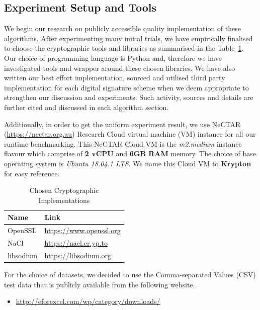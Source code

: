 \documentclass[10pt,sigconf]{acmart}
\begin{document}
\subsection{Experiment Setup and Tools}

We begin our research on publicly accessible quality implementation of these algorithms. After experimenting many initial trials, we have empirically finalised to choose the cryptographic tools and libraries as summarised in the Table~\ref{tab:libTable}. Our choice of programming language is Python and, therefore we have investigated tools and wrapper around these chosen libraries. We have also written our best effort implementation, sourced and utilised third party implementation for each digital signature scheme when we deem appropriate to strengthen our discussion and experiments. Such activity, sources and details are further cited and discussed in each algorithm section.

Additionally, in order to get the uniform experiment result, we use NeCTAR (\url{https://nectar.org.au}) Research Cloud virtual machine (VM) instance for all our runtime benchmarking. This NeCTAR Cloud VM is the \textit{m2.medium} instance flavour which comprise of \textbf{2 vCPU} and \textbf{6GB RAM} memory. The choice of base operating system is \textit{Ubuntu 18.04.1 LTS}. We name this Cloud VM to \textbf{Krypton} for easy reference. 

\begin{table}[H]
\caption{Chosen Cryptographic Implementations}
    \begin{tabular}{ |p{2cm}|p{5.5cm}|  }
    \hline
    \textbf{Name} & \textbf{Link} \\
    \hline
    OpenSSL & \url{https://www.openssl.org} \\
    \hline
    NaCl & \url{https://nacl.cr.yp.to} \\
    \hline
    libsodium & \url{https://libsodium.org} \\
    \hline    
    \end{tabular}
  \label{tab:libTable}
\end{table}

For the choice of datasets, we decided to use the Comma-separated Values (CSV) test data that is publicly available from the following website.
\begin{itemize}
    \item \href{http://eforexcel.com/wp/downloads-18-sample-csv-files-data-sets-for-testing-sales/}{http://eforexcel.com/wp/category/downloads/}
\end{itemize}
\end{document}

